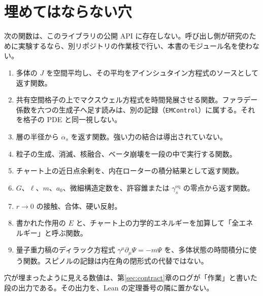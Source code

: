 \section{埋めてはならない穴}
\label{sec:holes}

次の関数は、このライブラリの公開 API に存在しない。呼び出し側が研究のために実験するなら、別リポジトリの作業枝で行い、本書のモジュール名を使わない。

\begin{enumerate}
\item 多体の \(J\) を空間平均し、その平均をアインシュタイン方程式のソースとして返す関数。
\item 共有空間格子の上でマクスウェル方程式を時間発展させる関数。ファラデー係数を六つの生成子へ足す読みは、別の記録（\texttt{EMControl}）に属する。それを格子の PDE と同一視しない。
\item 層の半径から \(\alpha_s\) を返す関数。強い力の結合は導出されていない。
\item 粒子の生成、消滅、核融合、ベータ崩壊を一段の中で実行する関数。
\item チャート上の近日点余剰を、内在ローターの積分結果として返す関数。
\item \(G\)、\(\ell\)、\(m\)、\(a_0\)、微細構造定数を、許容錐または \(\gamma_s^{\mathrm{eq}}\) の零点から返す関数。
\item \(r\to 0\) の接触、合体、硬い反射。
\item 書かれた作用の \(E\) と、チャート上の力学的エネルギーを加算して「全エネルギー」と呼ぶ関数。
\item 量子重力稿のディラック方程式 \(\gamma^\mu\partial_\mu\Psi=-m\Psi\) を、多体状態の時間積分に使う関数。スピノルの記録は内在角の閉形式の代替ではない。
\end{enumerate}

穴が埋まったように見える数値は、第\ref{sec:contract}章のログが「作業」と書いた段の出力である。その出力を、Lean の定理番号の隣に置かない。
